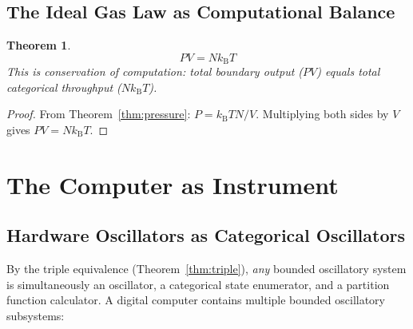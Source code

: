 \documentclass[11pt,a4paper]{article}
\newtheorem{theorem}{Theorem}[section]
\theoremstyle{definition}
\theoremstyle{remark}
\newcommand{\kB}{k_{\mathrm{B}}}
\begin{document}
\subsection{The Ideal Gas Law as Computational Balance}

\begin{theorem}
\label{thm:ideal_gas}
\begin{equation}
PV = N\kB T
\end{equation}
This is conservation of computation: total boundary output ($PV$) equals total categorical throughput ($N\kB T$).
\end{theorem}

\begin{proof}
From Theorem~\ref{thm:pressure}: $P = \kB T N / V$. Multiplying both sides by $V$ gives $PV = N\kB T$.
\end{proof}

\section{The Computer as Instrument}
\label{sec:computer_instrument}

\subsection{Hardware Oscillators as Categorical Oscillators}

By the triple equivalence (Theorem~\ref{thm:triple}), \emph{any} bounded oscillatory system is simultaneously an oscillator, a categorical state enumerator, and a partition function calculator. A digital computer contains multiple bounded oscillatory subsystems:
\end{document}

